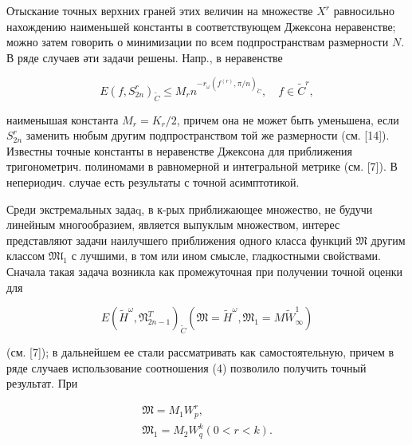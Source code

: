 \documentclass[10pt]{article}
\begin{document}
Отыскание точных верхних граней этих величин на множестве $X^{r}$ равносильно нахождению наименьшей константы в соответствующем Джексона неравенстве; можно затем говорить о минимизации по всем подпространствам размерности $N$. В ряде случаев әти задачи решены. Напр., в неравенстве



\[

E\left(f, S_{2 n}^{r}\right)_{\tilde{C}} \leqslant M_{r} n^{-r_{\omega}\left(f^{(r)}, \pi / n\right)_{\tilde{C}}}, \quad f \in \tilde{C}^{r},

\]



наименышая константа $M_{r}=K_{r} / 2$, причем она не может быть уменьшена, если $S_{2 n}^{r}$ заменить нюбым другим подпространством той же размерности (см. [14]). Известны точные константы в неравенстве Джексона для приближения тригонометрич. полиномами в равномерной и интегральной метрике (см. [7]). В непериодич. случае есть результаты с точной асимптотикой.



Среди экстремальных задаq, в к-рых приближающее множество, не будучи линейным многообразием, является выпуклым множеством, интерес представляют задачи наилучшего приближения одного класса функций $\mathfrak{M}$ другим классом $\mathfrak{M} \mathfrak{l}_{1}$ с лучшими, в том или ином смысле, гладкостными свойствами. Сначала такая задача возникла как промежуточная при получении точной оценки для



\[

E\left(\tilde{H}^{\omega}, \mathfrak{N}_{2 n-1}^{T}\right)_{\tilde{C}}\left(\mathfrak{M}=\tilde{H}^{\omega}, \mathfrak{M}_{1}=M \tilde{W}_{\infty}^{1}\right)

\]



(см. [7]); в дальнейшем ее стали рассматривать как самостоятельную, причем в ряде случаев использование соотношения (4) позволило получить точный результат. При



\[

\begin{gathered}

\mathfrak{M}=M_{1} W_{p}^{r}, \\

\mathfrak{M}_{1}=M_{2} W_{q}^{k}(0<r<k) .

\end{gathered}

\]
\end{document}

